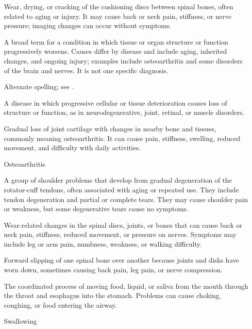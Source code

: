  Wear, drying, or cracking of the cushioning discs between spinal bones, often related to aging or injury. It may cause back or neck pain, stiffness, or nerve pressure; imaging changes can occur without symptoms.

 A broad term for a condition in which tissue or organ structure or function progressively worsens. Causes differ by disease and include aging, inherited changes, and ongoing injury; examples include osteoarthritis and some disorders of the brain and nerves. It is not one specific diagnosis.

 Alternate spelling; see .

 A disease in which progressive cellular or tissue deterioration causes loss of structure or function, as in neurodegenerative, joint, retinal, or muscle disorders.

 Gradual loss of joint cartilage with changes in nearby bone and tissues, commonly meaning osteoarthritis. It can cause pain, stiffness, swelling, reduced movement, and difficulty with daily activities.

\synonyms
Osteoarthritis

 A group of shoulder problems that develop from gradual degeneration of the rotator-cuff tendons, often associated with aging or repeated use. They include tendon degeneration and partial or complete tears. They may cause shoulder pain or weakness, but some degenerative tears cause no symptoms.

 Wear-related changes in the spinal discs, joints, or bones that can cause back or neck pain, stiffness, reduced movement, or pressure on nerves. Symptoms may include leg or arm pain, numbness, weakness, or walking difficulty.

 Forward slipping of one spinal bone over another because joints and disks have worn down, sometimes causing back pain, leg pain, or nerve compression.

 The coordinated process of moving food, liquid, or saliva from the mouth through the throat and esophagus into the stomach. Problems can cause choking, coughing, or food entering the airway.

\synonyms
Swallowing

